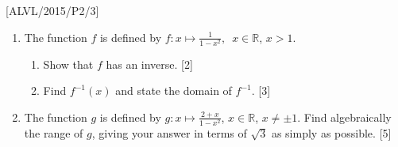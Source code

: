 \item {[}ALVL/2015/P2/3{]}
\begin{enumerate}
\item The function $f$ is defined by $f:x\mapsto\frac{1}{1-x^{2}},$~$x\in\mathbb{R}$,
$x>1$. 
\begin{enumerate}
\item Show that $f$ has an inverse. \hfill{}{[}2{]}
\item Find $f^{-1}\left(x\right)$ and state the domain of $f^{-1}$. \hfill{}{[}3{]}
\end{enumerate}
\item The function $g$ is defined by $g:x\mapsto\frac{2+x}{1-x^{2}}$,
$x\in\mathbb{R}$, $x\ne\pm1$. Find algebraically the range of $g$,
giving your answer in terms of $\sqrt{3}$ as simply as possible.
\hfill{} {[}5{]}
\end{enumerate}
